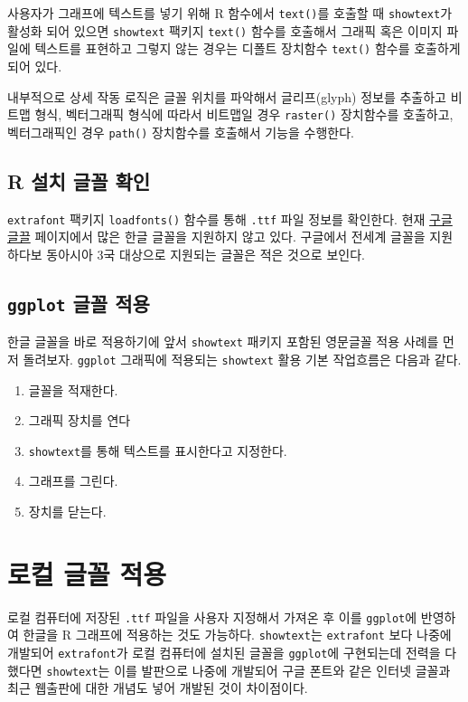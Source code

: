 \documentclass[
]{book}
\providecommand{\tightlist}{%
  \setlength{\itemsep}{0pt}\setlength{\parskip}{0pt}}
\begin{document}
사용자가 그래프에 텍스트를 넣기 위해 R 함수에서 \texttt{text()}를 호출할 때
\texttt{showtext}가 활성화 되어 있으면 \texttt{showtext} 팩키지 \texttt{text()} 함수를
호출해서 그래픽 혹은 이미지 파일에 텍스트를 표현하고 그렇지 않는 경우는
디폴트 장치함수 \texttt{text()} 함수를 호출하게 되어 있다.

내부적으로 상세 작동 로직은 글꼴 위치를 파악해서 글리프(glyph) 정보를
추출하고 비트맵 형식, 벡터그래픽 형식에 따라서 비트맵일 경우 \texttt{raster()}
장치함수를 호출하고, 벡터그래픽인 경우 \texttt{path()} 장치함수를 호출해서
기능을 수행한다.

\hypertarget{showtext-korean-example}{%
\subsection{R 설치 글꼴 확인}\label{showtext-korean-example}}

\texttt{extrafont} 팩키지 \texttt{loadfonts()} 함수를 통해 \texttt{.ttf} 파일 정보를
확인한다. 현재 \href{http://www.google.com/fonts}{구글 글끌} 페이지에서 많은 한글
글꼴을 지원하지 않고 있다. 구글에서 전세계 글꼴을 지원하다보 동아시아 3국 대상으로
지원되는 글꼴은 적은 것으로 보인다.

\hypertarget{font-showtext-korean-example-ggplot}{%
\subsection{\texorpdfstring{\texttt{ggplot} 글꼴 적용}{ggplot 글꼴 적용}}\label{font-showtext-korean-example-ggplot}}

한글 글꼴을 바로 적용하기에 앞서 \texttt{showtext} 패키지 포함된 영문글꼴 적용 사례를 먼저 돌려보자.
\texttt{ggplot} 그래픽에 적용되는 \texttt{showtext} 활용 기본 작업흐름은 다음과 같다.

\begin{enumerate}
\def\labelenumi{\arabic{enumi}.}
\tightlist
\item
  글꼴을 적재한다.
\item
  그래픽 장치를 연다
\item
  \texttt{showtext}를 통해 텍스트를 표시한다고 지정한다.
\item
  그래프를 그린다.
\item
  장치를 닫는다.
\end{enumerate}

\hypertarget{font-showtext-korean-example-ttf}{%
\section{로컬 글꼴 적용}\label{font-showtext-korean-example-ttf}}

로컬 컴퓨터에 저장된 \texttt{.ttf} 파일을 사용자 지정해서 가져온 후 이를
\texttt{ggplot}에 반영하여 한글을 R 그래프에 적용하는 것도 가능하다.
\texttt{showtext}는 \texttt{extrafont} 보다 나중에 개발되어 \texttt{extrafont}가
로컬 컴퓨터에 설치된 글꼴을 \texttt{ggplot}에 구현되는데 전력을 다했다면
\texttt{showtext}는 이를 발판으로 나중에 개발되어 구글 폰트와 같은
인터넷 글꼴과 최근 웹출판에 대한 개념도 넣어 개발된 것이 차이점이다.

  
\end{document}
